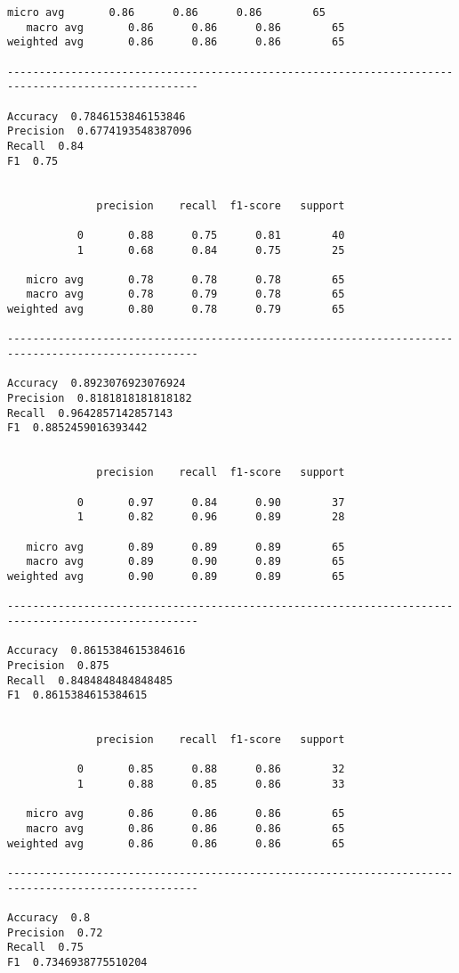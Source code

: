 \documentclass[11pt]{article}
\begin{document}
\begin{Verbatim}[commandchars=\\\{\}]
   micro avg       0.86      0.86      0.86        65
   macro avg       0.86      0.86      0.86        65
weighted avg       0.86      0.86      0.86        65

---------------------------------------------------------------------------------------------------- 

Accuracy  0.7846153846153846
Precision  0.6774193548387096
Recall  0.84
F1  0.75


              precision    recall  f1-score   support

           0       0.88      0.75      0.81        40
           1       0.68      0.84      0.75        25

   micro avg       0.78      0.78      0.78        65
   macro avg       0.78      0.79      0.78        65
weighted avg       0.80      0.78      0.79        65

---------------------------------------------------------------------------------------------------- 

Accuracy  0.8923076923076924
Precision  0.8181818181818182
Recall  0.9642857142857143
F1  0.8852459016393442


              precision    recall  f1-score   support

           0       0.97      0.84      0.90        37
           1       0.82      0.96      0.89        28

   micro avg       0.89      0.89      0.89        65
   macro avg       0.89      0.90      0.89        65
weighted avg       0.90      0.89      0.89        65

---------------------------------------------------------------------------------------------------- 

Accuracy  0.8615384615384616
Precision  0.875
Recall  0.8484848484848485
F1  0.8615384615384615


              precision    recall  f1-score   support

           0       0.85      0.88      0.86        32
           1       0.88      0.85      0.86        33

   micro avg       0.86      0.86      0.86        65
   macro avg       0.86      0.86      0.86        65
weighted avg       0.86      0.86      0.86        65

---------------------------------------------------------------------------------------------------- 

Accuracy  0.8
Precision  0.72
Recall  0.75
F1  0.7346938775510204



\end{Verbatim}
\end{document}
